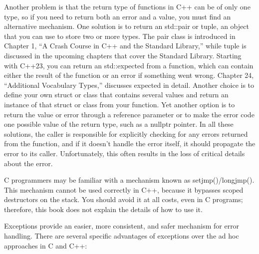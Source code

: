 Another problem is that the return type of functions in C++ can be of only one type, so if you need to return both an error and a value, you must find an alternative mechanism. One solution is to return an std::pair or tuple, an object that you can use to store two or more types. The pair class is introduced in Chapter 1, “A Crash Course in C++ and the Standard Library,” while tuple is discussed in the upcoming chapters that cover the Standard Library. Starting with C++23, you can return an std::expected from a function, which can contain either the result of the function or an error if something went wrong. Chapter 24, “Additional Vocabulary Types,” discusses expected in detail. Another choice is to define your own struct or class that contains several values and return an instance of that struct or class from your function. Yet another option is to return the value or error through a reference parameter or to make the error code one possible value of the return type, such as a nullptr pointer. In all these solutions, the caller is responsible for explicitly checking for any errors returned from the function, and if it doesn’t handle the error itself, it should propagate the error to its caller. Unfortunately, this often results in the loss of critical details about the error.

C programmers may be familiar with a mechanism known as setjmp()/longjmp(). This mechanism cannot be used correctly in C++, because it bypasses scoped destructors on the stack. You should avoid it at all costs, even in C programs; therefore, this book does not explain the details of how to use it.

Exceptions provide an easier, more consistent, and safer mechanism for error handling. There are several specific advantages of exceptions over the ad hoc approaches in C and C++:

